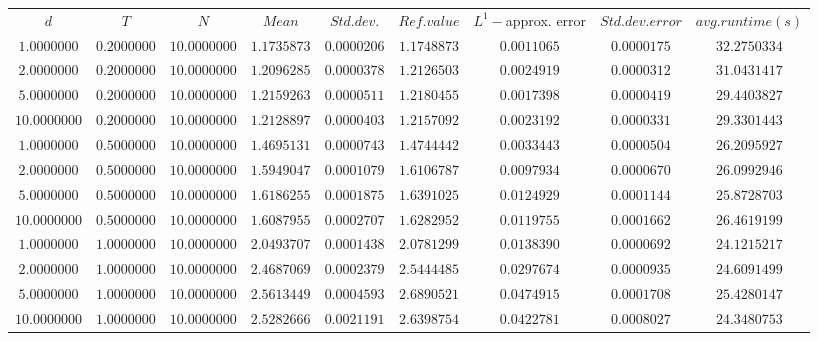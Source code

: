 \begin{tabular}{ccccccccc}
$d$ & $T$ & $N$ & $Mean$ & $Std. dev.$ & $Ref. value$ & $L^1-$approx. error & $Std. dev. error$ & $avg. runtime (s)$\\
$1.0000000$ & $0.2000000$ & $10.0000000$ & $1.1735873$ & $0.0000206$ & $1.1748873$ & $0.0011065$ & $0.0000175$ & $32.2750334$\\
$2.0000000$ & $0.2000000$ & $10.0000000$ & $1.2096285$ & $0.0000378$ & $1.2126503$ & $0.0024919$ & $0.0000312$ & $31.0431417$\\
$5.0000000$ & $0.2000000$ & $10.0000000$ & $1.2159263$ & $0.0000511$ & $1.2180455$ & $0.0017398$ & $0.0000419$ & $29.4403827$\\
$10.0000000$ & $0.2000000$ & $10.0000000$ & $1.2128897$ & $0.0000403$ & $1.2157092$ & $0.0023192$ & $0.0000331$ & $29.3301443$\\
$1.0000000$ & $0.5000000$ & $10.0000000$ & $1.4695131$ & $0.0000743$ & $1.4744442$ & $0.0033443$ & $0.0000504$ & $26.2095927$\\
$2.0000000$ & $0.5000000$ & $10.0000000$ & $1.5949047$ & $0.0001079$ & $1.6106787$ & $0.0097934$ & $0.0000670$ & $26.0992946$\\
$5.0000000$ & $0.5000000$ & $10.0000000$ & $1.6186255$ & $0.0001875$ & $1.6391025$ & $0.0124929$ & $0.0001144$ & $25.8728703$\\
$10.0000000$ & $0.5000000$ & $10.0000000$ & $1.6087955$ & $0.0002707$ & $1.6282952$ & $0.0119755$ & $0.0001662$ & $26.4619199$\\
$1.0000000$ & $1.0000000$ & $10.0000000$ & $2.0493707$ & $0.0001438$ & $2.0781299$ & $0.0138390$ & $0.0000692$ & $24.1215217$\\
$2.0000000$ & $1.0000000$ & $10.0000000$ & $2.4687069$ & $0.0002379$ & $2.5444485$ & $0.0297674$ & $0.0000935$ & $24.6091499$\\
$5.0000000$ & $1.0000000$ & $10.0000000$ & $2.5613449$ & $0.0004593$ & $2.6890521$ & $0.0474915$ & $0.0001708$ & $25.4280147$\\
$10.0000000$ & $1.0000000$ & $10.0000000$ & $2.5282666$ & $0.0021191$ & $2.6398754$ & $0.0422781$ & $0.0008027$ & $24.3480753$\\
\end{tabular}
